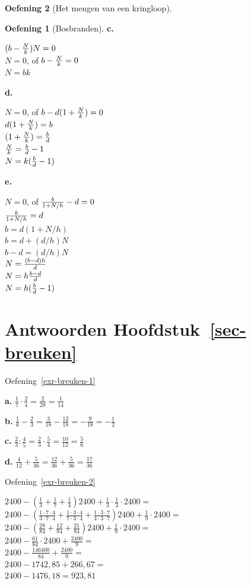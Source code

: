 \documentclass[
  a4paper,
]{scrbook}
\theoremstyle{definition}
\newtheorem{exercise}{Oefening}[chapter]
\theoremstyle{remark}
\begin{document}
\begin{exercise}[Het mengen van een
kringloop]
\begin{exercise}[Bosbranden]
\textbf{c.}

\((b-{N \over k})N=0\)\\
\(N=0\), of \(b - {N \over k} =0\)\\
\(N=bk\)

\textbf{d.}

\(N=0\), of \(b-d(1+{N \over k})=0\)\\
\(d(1+{N \over k})=b\)\\
\((1+{N \over k})={b\over d}\)\\
\({N \over k}={b \over d}-1\)\\
\(N=k({b\over d} -1)\)

\textbf{e.}

\(N=0\), of \({b \over 1+N/h}-d=0\)\\
\({b \over 1+N/h}=d\)\\
\(b=d(1+N/h)\)\\
\(b=d+(d/h)N\)\\
\(b-d=(d/h)N\)\\
\(N={(b-d)h \over d}\)\\
\(N=h{b-d \over d}\)\\
\(N=h({b \over d}-1)\)

\section*{\texorpdfstring{Antwoorden
Hoofdstuk~\ref{sec-breuken}}{Antwoorden Hoofdstuk~}}\label{antwoorden-sec-breuken}


Oefening~\ref{exr-breuken-1}

\textbf{a.}
\(\frac{1}{7}\cdot\frac{2}{4} = \frac{2}{28} = \frac{1}{14}\)

\textbf{b.}
\(\frac{1}{6}-\frac{2}{3}=\frac{3}{18}-\frac{12}{18}=-\frac{9}{18}=-\frac{1}{2}\)

\textbf{c.}
\(\frac{2}{3}:\frac{4}{5}=\frac{2}{3}\cdot\frac{5}{4}=\frac{10}{12}=\frac{5}{6}\)

\textbf{d.}
\(\frac{4}{12}+\frac{5}{36}=\frac{12}{36}+\frac{5}{36}=\frac{17}{36}\)

Oefening~\ref{exr-breuken-2}

\(2400-(\frac{1}{3}+\frac{1}{7}+\frac{1}{4})2400+\frac{1}{3}\cdot\frac{1}{3}\cdot2400=\)\\
\(2400-(\frac{1\cdot7\cdot4}{3\cdot7\cdot4}+\frac{1\cdot3\cdot4}{7\cdot3\cdot4}+\frac{1\cdot3\cdot7}{4\cdot3\cdot7})2400+\frac{1}{9}\cdot2400=\)\\
\(2400-(\frac{28}{84}+\frac{12}{84}+\frac{21}{84})2400+\frac{1}{9}\cdot2400=\)\\
\(2400-\frac{61}{84}\cdot2400+\frac{2400}{9}=\)\\
\(2400-\frac{146400}{84}+\frac{2400}{9}=\)\\
\(2400-1742,85+266,67=\)\\
\(2400-1476,18=923,81\)


\end{exercise}
\end{exercise}
\end{document}
